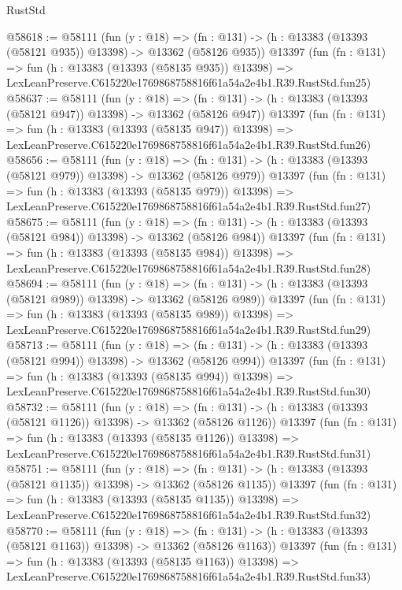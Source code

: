 \begin{lexlean}{RustStd}
\begin{coremodule}
@58618 := @58111
    (fun (y : @18) =>
    (fn : @131) -> (h : @13383 (@13393 (@58121 @935)) @13398) -> @13362 (@58126 @935))
    @13397
    (fun (fn : @131) =>
    fun (h : @13383 (@13393 (@58135 @935)) @13398) =>
    LexLeanPreserve.C615220e1769868758816f61a54a2e4b1.R39.RustStd.fun25)
@58637 := @58111
    (fun (y : @18) =>
    (fn : @131) -> (h : @13383 (@13393 (@58121 @947)) @13398) -> @13362 (@58126 @947))
    @13397
    (fun (fn : @131) =>
    fun (h : @13383 (@13393 (@58135 @947)) @13398) =>
    LexLeanPreserve.C615220e1769868758816f61a54a2e4b1.R39.RustStd.fun26)
@58656 := @58111
    (fun (y : @18) =>
    (fn : @131) -> (h : @13383 (@13393 (@58121 @979)) @13398) -> @13362 (@58126 @979))
    @13397
    (fun (fn : @131) =>
    fun (h : @13383 (@13393 (@58135 @979)) @13398) =>
    LexLeanPreserve.C615220e1769868758816f61a54a2e4b1.R39.RustStd.fun27)
@58675 := @58111
    (fun (y : @18) =>
    (fn : @131) -> (h : @13383 (@13393 (@58121 @984)) @13398) -> @13362 (@58126 @984))
    @13397
    (fun (fn : @131) =>
    fun (h : @13383 (@13393 (@58135 @984)) @13398) =>
    LexLeanPreserve.C615220e1769868758816f61a54a2e4b1.R39.RustStd.fun28)
@58694 := @58111
    (fun (y : @18) =>
    (fn : @131) -> (h : @13383 (@13393 (@58121 @989)) @13398) -> @13362 (@58126 @989))
    @13397
    (fun (fn : @131) =>
    fun (h : @13383 (@13393 (@58135 @989)) @13398) =>
    LexLeanPreserve.C615220e1769868758816f61a54a2e4b1.R39.RustStd.fun29)
@58713 := @58111
    (fun (y : @18) =>
    (fn : @131) -> (h : @13383 (@13393 (@58121 @994)) @13398) -> @13362 (@58126 @994))
    @13397
    (fun (fn : @131) =>
    fun (h : @13383 (@13393 (@58135 @994)) @13398) =>
    LexLeanPreserve.C615220e1769868758816f61a54a2e4b1.R39.RustStd.fun30)
@58732 := @58111
    (fun (y : @18) =>
    (fn : @131) -> (h : @13383 (@13393 (@58121 @1126)) @13398) -> @13362 (@58126 @1126))
    @13397
    (fun (fn : @131) =>
    fun (h : @13383 (@13393 (@58135 @1126)) @13398) =>
    LexLeanPreserve.C615220e1769868758816f61a54a2e4b1.R39.RustStd.fun31)
@58751 := @58111
    (fun (y : @18) =>
    (fn : @131) -> (h : @13383 (@13393 (@58121 @1135)) @13398) -> @13362 (@58126 @1135))
    @13397
    (fun (fn : @131) =>
    fun (h : @13383 (@13393 (@58135 @1135)) @13398) =>
    LexLeanPreserve.C615220e1769868758816f61a54a2e4b1.R39.RustStd.fun32)
@58770 := @58111
    (fun (y : @18) =>
    (fn : @131) -> (h : @13383 (@13393 (@58121 @1163)) @13398) -> @13362 (@58126 @1163))
    @13397
    (fun (fn : @131) =>
    fun (h : @13383 (@13393 (@58135 @1163)) @13398) =>
    LexLeanPreserve.C615220e1769868758816f61a54a2e4b1.R39.RustStd.fun33)

\end{coremodule}
\end{lexlean}
